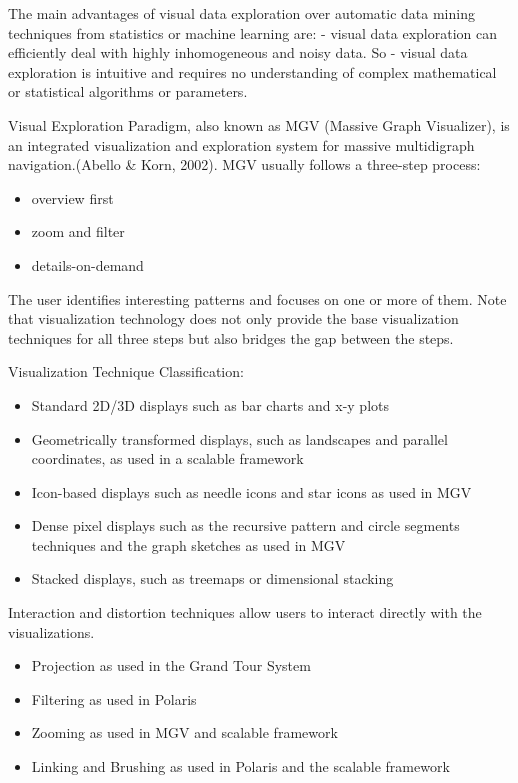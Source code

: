 \documentclass[print]{nuthesis}
\providecommand{\tightlist}{%
  \setlength{\itemsep}{0pt}\setlength{\parskip}{0pt}}
\begin{document}
The main advantages of visual data exploration over automatic data mining techniques from statistics or machine learning are:
- visual data exploration can efficiently deal with highly inhomogeneous and noisy data.
So - visual data exploration is intuitive and requires no understanding of complex mathematical or statistical algorithms or parameters.

Visual Exploration Paradigm, also known as MGV (Massive Graph Visualizer), is an integrated visualization and exploration system for massive multidigraph navigation.(Abello \& Korn, 2002). MGV usually follows a three-step process:

\begin{itemize}
\tightlist
\item
  overview first
\item
  zoom and filter
\item
  details-on-demand
\end{itemize}

The user identifies interesting patterns and focuses on one or more of them. Note that visualization technology does not only provide the base visualization techniques for all three steps but also bridges the gap between the steps.

Visualization Technique Classification:

\begin{itemize}
\tightlist
\item
  Standard 2D/3D displays such as bar charts and x-y plots
\item
  Geometrically transformed displays, such as landscapes and parallel coordinates, as used in a scalable framework
\item
  Icon-based displays such as needle icons and star icons as used in MGV
\item
  Dense pixel displays such as the recursive pattern and circle segments techniques and the graph sketches as used in MGV
\item
  Stacked displays, such as treemaps or dimensional stacking
\end{itemize}

Interaction and distortion techniques allow users to interact directly with the visualizations.

\begin{itemize}
\tightlist
\item
  Projection as used in the Grand Tour System
\item
  Filtering as used in Polaris
\item
  Zooming as used in MGV and scalable framework
\item
  Linking and Brushing as used in Polaris and the scalable framework
\end{itemize}
\end{document}
